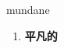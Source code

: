 
\begin{frame}
{\huge mundane}
\begin{center}
\begin{enumerate}\Large
  \item \textbf{平凡的}
\end{enumerate}
\end{center}
\end{frame}
